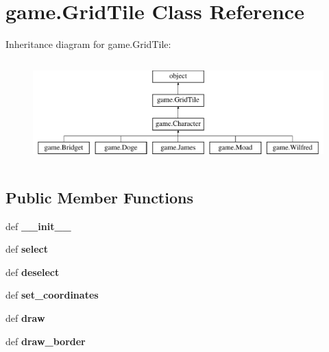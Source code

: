 \hypertarget{classgame_1_1GridTile}{\section{game.\-Grid\-Tile Class Reference}
\label{classgame_1_1GridTile}
}
Inheritance diagram for game.\-Grid\-Tile\-:\begin{figure}[H]
\begin{center}
\leavevmode
\includegraphics[height=4.000000cm]{classgame_1_1GridTile}
\end{center}
\end{figure}
\subsection*{Public Member Functions}
\begin{DoxyCompactItemize}
\item 
\hypertarget{classgame_1_1GridTile_a30ee8976e7630e986896d66bf3529cb1}{def {\bfseries \-\_\-\-\_\-init\-\_\-\-\_\-}}\label{classgame_1_1GridTile_a30ee8976e7630e986896d66bf3529cb1}

\item 
\hypertarget{classgame_1_1GridTile_a7dcddf78ff6e1130d140711c97529330}{def {\bfseries select}}\label{classgame_1_1GridTile_a7dcddf78ff6e1130d140711c97529330}

\item 
\hypertarget{classgame_1_1GridTile_ae2bc20ca4845608079fe3aa69630f820}{def {\bfseries deselect}}\label{classgame_1_1GridTile_ae2bc20ca4845608079fe3aa69630f820}

\item 
\hypertarget{classgame_1_1GridTile_afc0ebde63e213a9a4b930431cf60828c}{def {\bfseries set\-\_\-coordinates}}\label{classgame_1_1GridTile_afc0ebde63e213a9a4b930431cf60828c}

\item 
\hypertarget{classgame_1_1GridTile_a322a252e74a30c2466554d2a35d4144e}{def {\bfseries draw}}\label{classgame_1_1GridTile_a322a252e74a30c2466554d2a35d4144e}

\item 
\hypertarget{classgame_1_1GridTile_a77e0987e5c2539f3ad2964945dc29ed9}{def {\bfseries draw\-\_\-border}}\label{classgame_1_1GridTile_a77e0987e5c2539f3ad2964945dc29ed9}

\end{DoxyCompactItemize}
